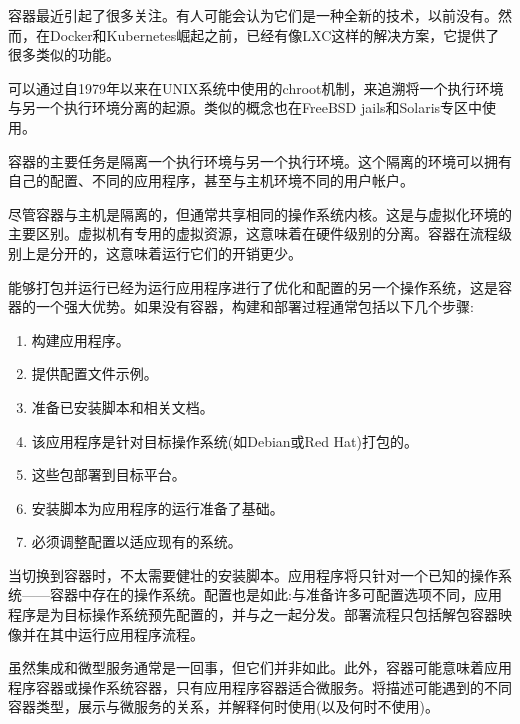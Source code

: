 

容器最近引起了很多关注。有人可能会认为它们是一种全新的技术，以前没有。然而，在Docker和Kubernetes崛起之前，已经有像LXC这样的解决方案，它提供了很多类似的功能。

可以通过自1979年以来在UNIX系统中使用的chroot机制，来追溯将一个执行环境与另一个执行环境分离的起源。类似的概念也在FreeBSD jails和Solaris专区中使用。

容器的主要任务是隔离一个执行环境与另一个执行环境。这个隔离的环境可以拥有自己的配置、不同的应用程序，甚至与主机环境不同的用户帐户。

尽管容器与主机是隔离的，但通常共享相同的操作系统内核。这是与虚拟化环境的主要区别。虚拟机有专用的虚拟资源，这意味着在硬件级别的分离。容器在流程级别上是分开的，这意味着运行它们的开销更少。

能够打包并运行已经为运行应用程序进行了优化和配置的另一个操作系统，这是容器的一个强大优势。如果没有容器，构建和部署过程通常包括以下几个步骤:

\begin{enumerate}
\item 
构建应用程序。

\item 
提供配置文件示例。

\item 
准备已安装脚本和相关文档。

\item 
该应用程序是针对目标操作系统(如Debian或Red Hat)打包的。

\item 
这些包部署到目标平台。

\item 
安装脚本为应用程序的运行准备了基础。

\item 
必须调整配置以适应现有的系统。
\end{enumerate}

当切换到容器时，不太需要健壮的安装脚本。应用程序将只针对一个已知的操作系统——容器中存在的操作系统。配置也是如此:与准备许多可配置选项不同，应用程序是为目标操作系统预先配置的，并与之一起分发。部署流程只包括解包容器映像并在其中运行应用程序流程。

虽然集成和微型服务通常是一回事，但它们并非如此。此外，容器可能意味着应用程序容器或操作系统容器，只有应用程序容器适合微服务。将描述可能遇到的不同容器类型，展示与微服务的关系，并解释何时使用(以及何时不使用)。


